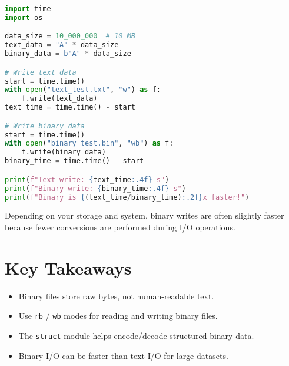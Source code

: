 \begin{lstlisting}[language=Python, caption={Comparing binary and text file speeds.}]
import time
import os

data_size = 10_000_000  # 10 MB
text_data = "A" * data_size
binary_data = b"A" * data_size

# Write text data
start = time.time()
with open("text_test.txt", "w") as f:
    f.write(text_data)
text_time = time.time() - start

# Write binary data
start = time.time()
with open("binary_test.bin", "wb") as f:
    f.write(binary_data)
binary_time = time.time() - start

print(f"Text write: {text_time:.4f} s")
print(f"Binary write: {binary_time:.4f} s")
print(f"Binary is {(text_time/binary_time):.2f}x faster!")
\end{lstlisting}

Depending on your storage and system, binary writes are often slightly faster 
because fewer conversions are performed during I/O operations.

\section*{Key Takeaways}
\begin{itemize}
  \item Binary files store raw bytes, not human-readable text.
  \item Use \texttt{rb} / \texttt{wb} modes for reading and writing binary files.
  \item The \texttt{struct} module helps encode/decode structured binary data.
  \item Binary I/O can be faster than text I/O for large datasets.
\end{itemize}
